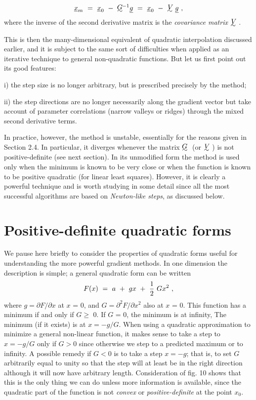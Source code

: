                      $${\underline{x}}_m~=~{\underline{x}}_0~-~\UTG\!\!^{-1}{\underline{g}}~=~
{\underline{x}}_0~-~\UTV{\underline{g}}~,$$
 where the inverse of the second derivative matrix is the {\em covariance
matrix} $\UTV$.
 
     This is then the many-dimensional equivalent of quadratic
interpolation
discussed earlier, and it is subject to the same sort of difficulties
when applied as an iterative technique to general non-quadratic functions.
But let us first point out its good features:
 
  i) the step size is no longer arbitrary, but is prescribed precisely by
     the method;
 
 ii) the step directions are no longer necessarily along the gradient
     vector but take account of parameter correlations (narrow valleys
     or ridges) through the mixed second derivative terms.
 
     In practice, however, the method is unstable, essentially for the
reasons given in Section 2.4.  In particular, it diverges whenever the
matrix $\UTG$ (or $\UTV$) is not positive-definite (see next section).  In its
unmodified form  the method is used only when the minimum is known to
be very close or when the function is known to be positive quadratic (for
linear least squares).  However, it is clearly a powerful technique
and is worth studying in some detail since all the most successful
algorithms are based on {\em Newton-like steps}, as discussed below.
 
\section{Positive-definite quadratic forms}
 
     We pause here briefly to consider the properties of quadratic forms
useful for understanding the more powerful gradient methods.  In one
dimension the description is simple;  a general quadratic form can be
written
  $$F(x)~=~a~+~gx~+~{1\over 2}~Gx^2~, $$
 where $g = \partial F/\partial x$ at $x$ = 0, and $G = \partial^2 F/\partial x^2$ also at $x$ = 0.
This function
has a minimum if and only if $G \ge$ 0.  If $G$ = 0, the minimum is at infinity,
The minimum (if it exists) is at $x = -g/G$.  When using a quadratic
approximation to minimize a general non-linear function, it makes sense to
take a step to $x = -g/G$ only if $G > 0$ since otherwise we step to
a predicted maximum or to infinity.  A possible remedy if $G < 0$ is to
take a
step $x = -g$;  that is, to set $G$ arbitrarily equal to unity so that the
step will at least be in the right direction although it will now have
arbitrary length.  Consideration of fig. 10 shows that this is
the only thing we can do unless more information is available, since the
quadratic part of the function is not {\em convex} or {\em positive-definite} at
the point $x_0$.
 

